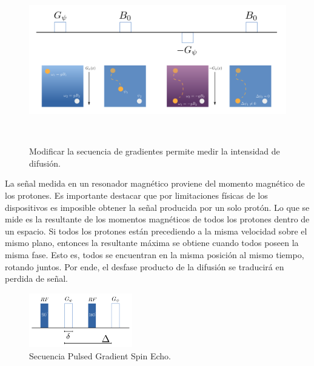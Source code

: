 \begin{figure}
                                                                                                                        
\begin{minipage}[b]{\textwidth}
    \includegraphics[width=\textwidth]{1.background/dmri/img/dmri.png}
    \caption{Modificar la secuencia de gradientes permite medir la
             intensidad de difusi\'on.}
    \label{fig:dmri}
\end{minipage} ~

\end{figure}  

La se\~nal medida en un resonador magn\'etico proviene del 
momento magn\'etico de los protones. Es importante destacar que por
limitaciones f\'isicas de los
dispositivos es imposible obtener la se\~nal producida por un
solo prot\'on. Lo que se mide es la resultante de los momentos magn\'eticos
de todos los protones dentro de un espacio. Si todos los protones est\'an
precediendo a la misma velocidad sobre el mismo plano, entonces la
resultante m\'axima se obtiene cuando todos poseen la misma fase. Esto es,
todos se encuentran en la misma posici\'on al mismo tiempo, rotando
juntos. Por ende, el desfase producto de la difusi\'on se traducir\'a en
perdida de se\~nal.\\

\begin{figure}
    \begin{center}
        \vspace{-1cm}
        \includegraphics[width=0.4\textwidth]{1.background/dmri/img/fgp.png}
        \caption{Secuencia Pulsed Gradient Spin Echo.}
        \label{fig:fgp}
    \end{center}
\end{figure}  

